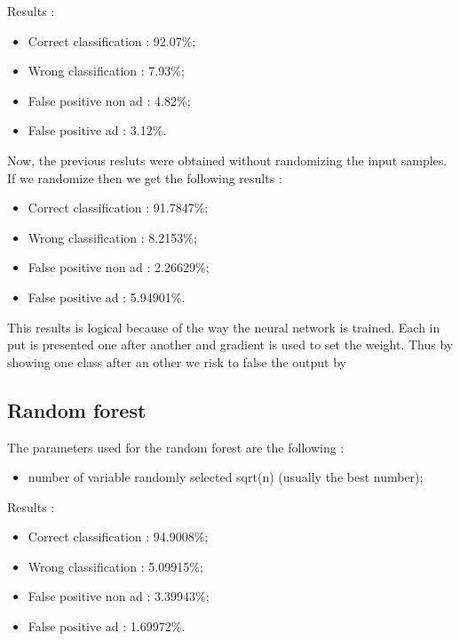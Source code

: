   Results :
  \begin{itemize}
    \item Correct classification : 92.07\%;
    \item Wrong classification : 7.93\%;
    \item False positive non ad : 4.82\%;
    \item False positive ad : 3.12\%.
  \end{itemize}

  Now, the previous resluts were obtained without randomizing the input samples. If we randomize then we get the following results :
  \begin{itemize}
    \item Correct classification : 91.7847\%;
    \item Wrong classification : 8.2153\%;
    \item False positive non ad : 2.26629\%;
    \item False positive ad : 5.94901\%.
  \end{itemize}

  This results is logical because of the way the neural network is trained. Each in put is presented one after another and gradient is used to set the weight. Thus by showing one class after an other we risk to false the output by
\subsection{Random forest}
The parameters used for the random forest are the following :
  \begin{itemize}
    \item number of variable randomly selected sqrt(n) (usually the best number);
  \end{itemize}
Results :
\begin{itemize}
  \item Correct classification : 94.9008\%;
  \item Wrong classification : 5.09915\%;
  \item False positive non ad : 3.39943\%;
  \item False positive ad : 1.69972\%.
\end{itemize}
